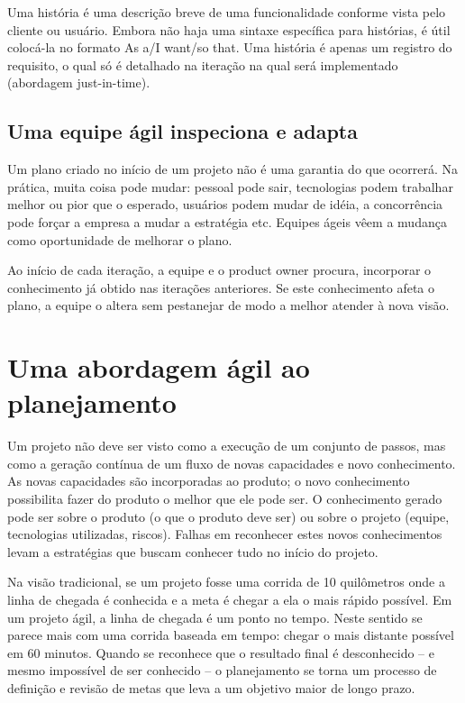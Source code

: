 \documentclass[a4paper,abntfigtabnum,noindentfirst]{abnt}
\begin{document}
Uma história é uma descrição breve de uma funcionalidade conforme vista pelo cliente ou usuário. Embora não haja uma sintaxe específica para histórias, é útil colocá-la no formato As a/I want/so that. Uma história é apenas um registro do requisito, o qual só é detalhado na iteração na qual será implementado (abordagem just-in-time).


\subsection{Uma equipe ágil inspeciona e adapta}

Um plano criado no início de um projeto não é uma garantia do que ocorrerá. Na prática, muita coisa pode mudar: pessoal pode sair, tecnologias podem trabalhar melhor ou pior que o esperado, usuários podem mudar de idéia, a concorrência pode forçar a empresa a mudar a estratégia etc. Equipes ágeis vêem a mudança como oportunidade de melhorar o plano.

Ao início de cada iteração, a equipe e o product owner procura, incorporar o conhecimento já obtido nas iterações anteriores. Se este conhecimento afeta o plano, a equipe o altera sem pestanejar de modo a melhor atender à nova visão.


\section{Uma abordagem ágil ao planejamento}

Um projeto não deve ser visto como a execução de um conjunto de passos, mas como a geração contínua de um fluxo de novas capacidades e novo conhecimento. As novas capacidades são incorporadas ao produto; o novo conhecimento possibilita fazer do produto o melhor que ele pode ser. O conhecimento gerado pode ser sobre o produto (o que o produto deve ser) ou sobre o projeto (equipe, tecnologias utilizadas, riscos). Falhas em reconhecer estes novos conhecimentos levam a estratégias que buscam conhecer tudo no início do projeto.

Na visão tradicional, se um projeto fosse uma corrida de 10 quilômetros onde a linha de chegada é conhecida e a meta é chegar a ela o mais rápido possível. Em um projeto ágil, a linha de chegada é um ponto no tempo. Neste sentido se parece mais com uma corrida baseada em tempo: chegar o mais distante possível em 60 minutos. Quando se reconhece que o resultado final é desconhecido – e mesmo impossível de ser conhecido – o planejamento se torna um processo de definição e revisão de metas que leva a um objetivo maior de longo prazo.
\end{document}
